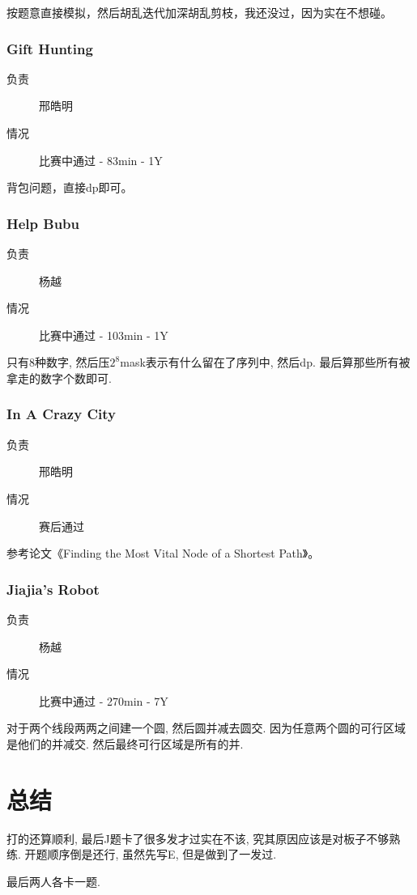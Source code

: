 \documentclass[a4paper, 11pt, nofonts, nocap, fancyhdr]{ctexart}
\newcommand{\problem}[1]{\subsubsection{#1}}
\begin{document}
按题意直接模拟，然后胡乱迭代加深胡乱剪枝，我还没过，因为实在不想碰。

\problem{Gift Hunting}

\begin{description}
\item[负责] 邢皓明
\item[情况] 比赛中通过 - 83min - 1Y
\end{description}

背包问题，直接dp即可。

\problem{Help Bubu}

\begin{description}
\item[负责] 杨越
\item[情况] 比赛中通过 - 103min - 1Y
\end{description}

只有8种数字, 然后压$2^8$mask表示有什么留在了序列中, 然后dp. 最后算那些所有被拿走的数字个数即可.

\problem{In A Crazy City}

\begin{description}
\item[负责] 邢皓明
\item[情况] 赛后通过
\end{description}

参考论文《Finding the Most Vital Node of a Shortest Path》。

\problem{Jiajia's Robot}

\begin{description}
\item[负责] 杨越
\item[情况] 比赛中通过 - 270min - 7Y
\end{description}

对于两个线段两两之间建一个圆, 然后圆并减去圆交. 因为任意两个圆的可行区域是他们的并减交. 然后最终可行区域是所有的并. 

\section{总结}

打的还算顺利, 最后J题卡了很多发才过实在不该, 究其原因应该是对板子不够熟练. 开题顺序倒是还行, 虽然先写E, 但是做到了一发过. 

最后两人各卡一题.
\end{document}
